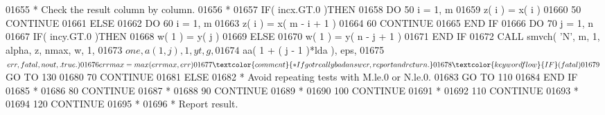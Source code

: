 \begin{DoxyCode}
01655 \textcolor{comment}{*                       Check the result column by column.}
01656 \textcolor{comment}{*}
01657                         \textcolor{keywordflow}{IF}( incx.GT.0 )\textcolor{keywordflow}{THEN}
01658                            \textcolor{keywordflow}{DO} 50 i = 1, m
01659                               z( i ) = x( i )
01660    50                      \textcolor{keywordflow}{CONTINUE}
01661                         \textcolor{keywordflow}{ELSE}
01662                            \textcolor{keywordflow}{DO} 60 i = 1, m
01663                               z( i ) = x( m - i + 1 )
01664    60                      \textcolor{keywordflow}{CONTINUE}
01665 \textcolor{keywordflow}{                        END IF}
01666                         \textcolor{keywordflow}{DO} 70 j = 1, n
01667                            \textcolor{keywordflow}{IF}( incy.GT.0 )\textcolor{keywordflow}{THEN}
01668                               w( 1 ) = y( j )
01669                            \textcolor{keywordflow}{ELSE}
01670                               w( 1 ) = y( n - j + 1 )
01671 \textcolor{keywordflow}{                           END IF}
01672                            \textcolor{keyword}{CALL }smvch( \textcolor{stringliteral}{'N'}, m, 1, alpha, z, nmax, w, 1,
01673      $                                 one, a( 1, j ), 1, yt, g,
01674      $                                 aa( 1 + ( j - 1 )*lda ), eps,
01675      $                                 err, fatal, nout, .true. )
01676                            errmax = max( errmax, err )
01677 \textcolor{comment}{*                          If got really bad answer, report and return.}
01678                            \textcolor{keywordflow}{IF}( fatal )
01679      $                        \textcolor{keywordflow}{GO TO} 130
01680    70                   \textcolor{keywordflow}{CONTINUE}
01681                      \textcolor{keywordflow}{ELSE}
01682 \textcolor{comment}{*                       Avoid repeating tests with M.le.0 or N.le.0.}
01683                         \textcolor{keywordflow}{GO TO} 110
01684 \textcolor{keywordflow}{                     END IF}
01685 \textcolor{comment}{*}
01686    80             \textcolor{keywordflow}{CONTINUE}
01687 \textcolor{comment}{*}
01688    90          \textcolor{keywordflow}{CONTINUE}
01689 \textcolor{comment}{*}
01690   100       \textcolor{keywordflow}{CONTINUE}
01691 \textcolor{comment}{*}
01692   110    \textcolor{keywordflow}{CONTINUE}
01693 \textcolor{comment}{*}
01694   120 \textcolor{keywordflow}{CONTINUE}
01695 \textcolor{comment}{*}
01696 \textcolor{comment}{*     Report result.}

\end{DoxyCode}
